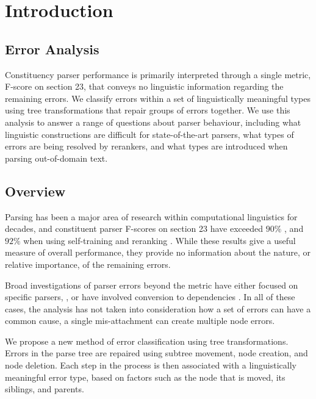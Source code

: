 \chapter{Introduction}


\section{Error Analysis}

Constituency parser performance is primarily interpreted through a single
metric, F-score on \wsj section 23, that conveys no linguistic information
regarding the remaining errors.  We classify errors within a set of
linguistically meaningful types using tree transformations that repair groups
of errors together.  We use this analysis to answer a range of questions about
parser behaviour, including what linguistic constructions are difficult for
state-of-the-art parsers, what types of errors are being resolved by rerankers,
and what types are introduced when parsing out-of-domain text.

\section{Overview}

Parsing has been a major area of research within computational linguistics for
decades, and constituent parser F-scores on \wsj section 23 have exceeded
$90\%$ \cite{Petrov-Klein:2007}, and $92\%$ when using self-training and
reranking \cite{McClosky-Charniak-Johnson:2006,Charniak-Johnson:2005}. 
While
these results give a useful measure of overall performance, they provide no
information about the nature, or relative importance, of the remaining errors.

Broad investigations of parser errors beyond the \parseval metric
\cite{Black-etal:1991} have either focused on specific parsers, \eg
\cite{Collins:2003}, or have involved conversion to dependencies
\cite{Carroll-etal:1998,King:2003}.  In all of these cases, the analysis has
not taken into consideration how a set of errors can have a common cause, \eg a
single mis-attachment can create multiple node errors.

We propose a new method of error classification using tree transformations.
Errors in the parse tree are repaired using subtree movement, node
creation, and node deletion.  Each step in the process is then associated with
a linguistically meaningful error type, based on factors such as the node that is
moved, its siblings, and parents.  

